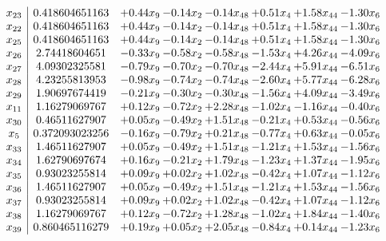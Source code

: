 \documentclass[8pt]{article}
\begin{document}
\[\begin{array}{c| c c@{\hskip 2pt} c@{\hskip 2pt} c@{\hskip 2pt} c@{\hskip 2pt} c@{\hskip 2pt} c@{\hskip 2pt} }
 x_{23}   &  0.418604651163 & +  0.44 x_{9} & -0.14 x_{2} & -0.14 x_{48} & +  0.51 x_{4} & +  1.58 x_{44} & -1.30 x_{6}\\
 x_{22}   &  0.418604651163 & +  0.44 x_{9} & -0.14 x_{2} & -0.14 x_{48} & +  0.51 x_{4} & +  1.58 x_{44} & -1.30 x_{6}\\
 x_{25}   &  0.418604651163 & +  0.44 x_{9} & -0.14 x_{2} & -0.14 x_{48} & +  0.51 x_{4} & +  1.58 x_{44} & -1.30 x_{6}\\
 x_{26}   &  2.74418604651 & -0.33 x_{9} & -0.58 x_{2} & -0.58 x_{48} & -1.53 x_{4} & +  4.26 x_{44} & -4.09 x_{6}\\
 x_{27}   &  4.09302325581 & -0.79 x_{9} & -0.70 x_{2} & -0.70 x_{48} & -2.44 x_{4} & +  5.91 x_{44} & -6.51 x_{6}\\
 x_{28}   &  4.23255813953 & -0.98 x_{9} & -0.74 x_{2} & -0.74 x_{48} & -2.60 x_{4} & +  5.77 x_{44} & -6.28 x_{6}\\
 x_{29}   &  1.90697674419 & -0.21 x_{9} & -0.30 x_{2} & -0.30 x_{48} & -1.56 x_{4} & +  4.09 x_{44} & -3.49 x_{6}\\
 x_{11}   &  1.16279069767 & +  0.12 x_{9} & -0.72 x_{2} & +  2.28 x_{48} & -1.02 x_{4} & -1.16 x_{44} & -0.40 x_{6}\\
 x_{30}   &  0.46511627907 & +  0.05 x_{9} & -0.49 x_{2} & +  1.51 x_{48} & -0.21 x_{4} & +  0.53 x_{44} & -0.56 x_{6}\\
 x_{5}   &  0.372093023256 & -0.16 x_{9} & -0.79 x_{2} & +  0.21 x_{48} & -0.77 x_{4} & +  0.63 x_{44} & -0.05 x_{6}\\
 x_{33}   &  1.46511627907 & +  0.05 x_{9} & -0.49 x_{2} & +  1.51 x_{48} & -1.21 x_{4} & +  1.53 x_{44} & -1.56 x_{6}\\
 x_{34}   &  1.62790697674 & +  0.16 x_{9} & -0.21 x_{2} & +  1.79 x_{48} & -1.23 x_{4} & +  1.37 x_{44} & -1.95 x_{6}\\
 x_{35}   &  0.93023255814 & +  0.09 x_{9} & +  0.02 x_{2} & +  1.02 x_{48} & -0.42 x_{4} & +  1.07 x_{44} & -1.12 x_{6}\\
 x_{36}   &  1.46511627907 & +  0.05 x_{9} & -0.49 x_{2} & +  1.51 x_{48} & -1.21 x_{4} & +  1.53 x_{44} & -1.56 x_{6}\\
 x_{37}   &  0.93023255814 & +  0.09 x_{9} & +  0.02 x_{2} & +  1.02 x_{48} & -0.42 x_{4} & +  1.07 x_{44} & -1.12 x_{6}\\
 x_{38}   &  1.16279069767 & +  0.12 x_{9} & -0.72 x_{2} & +  1.28 x_{48} & -1.02 x_{4} & +  1.84 x_{44} & -1.40 x_{6}\\
 x_{39}   &  0.860465116279 & +  0.19 x_{9} & +  0.05 x_{2} & +  2.05 x_{48} & -0.84 x_{4} & +  0.14 x_{44} & -1.23 x_{6}\\

\end{array}\]
\end{document}

